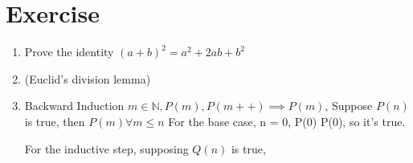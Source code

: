\documentclass[11pt]{report}
\begin{document}
\section{Exercise}
\label{sec:orgd64c29d}
\begin{enumerate}
\item Prove the identity \((a+b)^2 = a^2 + 2ab + b^2\)
\label{sec:orgf81a1d8}
\item (Euclid's division lemma)
\label{sec:orga8e539d}
\item Backward Induction
\label{sec:org76dec18}
\(m \in \mathbb{N}, P(m), P(m++) \implies P(m)\), Suppose \(P(n)\) is true, then \(P(m) \forall m \le n\)
For the base case, n = 0,
P(0) \implies P(0), so it's true.

For the inductive step, supposing \(Q(n)\) is true,
\end{enumerate}
\end{document}
